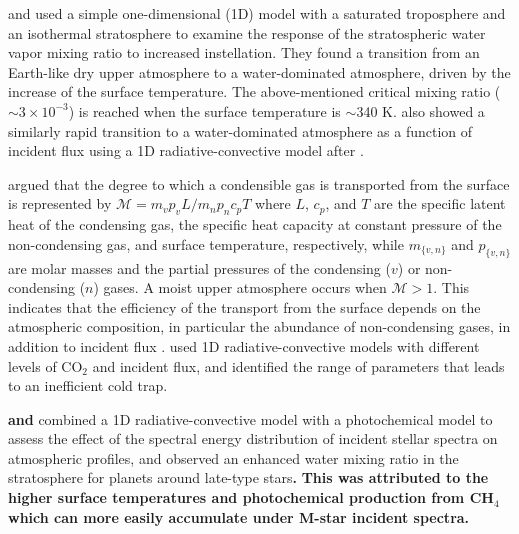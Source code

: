 \documentclass[11pt,numberedappendix,twocolappendix,]{emulateapj}
\def\wv{water vapor}
\def\revise#1{{\bf #1}}
\begin{document}
\citet{Kasting1993} and \citet{Kopparapu2013} used a simple one-dimensional (1D) model with a saturated troposphere and an isothermal stratosphere to examine the response of the stratospheric \wv{} mixing ratio to increased instellation. 
They found a transition from an Earth-like dry upper atmosphere to a water-dominated atmosphere, driven by the increase of the surface temperature. 
The above-mentioned critical mixing ratio ($\sim 3 \times 10^{-3}$) is reached when the surface temperature is $\sim $340 K. 
\citet{Kodama2015} also showed a similarly rapid transition to a water-dominated atmosphere as a function of incident flux using a 1D radiative-convective model after \citet{Abe1988}. 

\citet{Wordsworth2013,Wordsworth2014} argued that the degree to which a condensible gas is transported from the surface is represented by $\mathcal{M} = m_v p_v L / m_n p_n c_p T $ where $L$, $c_p$, and $T$ are the specific latent heat of the condensing gas, the specific heat capacity at constant pressure of the non-condensing gas, and surface  temperature, respectively, while $m_{\{v,n\}}$ and $p_{\{v,n\}}$ are molar masses and the partial pressures of the  condensing ($v$) or non-condensing ($n$) gases. 
A moist upper atmosphere occurs when $\mathcal{M} > 1$. 
This indicates that the efficiency of the transport from the surface depends on the atmospheric composition, in particular the abundance of non-condensing gases, in addition to incident flux \citep{Wordsworth2014}. 
\citet{Wordsworth2013} used 1D radiative-convective models with different levels of CO$_2$ and incident flux, and identified the range of parameters that leads to an inefficient cold trap. 

\revise{\citet{Rauer2011} and}{} \citet{Rugheimer2013,Rugheimer2015} combined a 1D radiative-convective model with a photochemical model to assess the effect of the spectral energy distribution of incident stellar spectra on atmospheric profiles, and observed an enhanced water mixing ratio in the stratosphere for planets around late-type stars\revise{.} \revise{This was attributed to the higher surface temperatures and photochemical production from CH$_4$ which can more easily accumulate under M-star incident spectra. }{}
\end{document}
